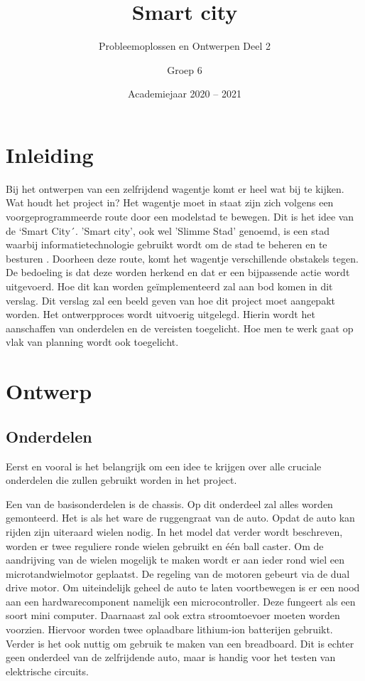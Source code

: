 \documentclass[a4paper,twoside,kulak]{kulakreport} %
\title{Smart city}
\subtitle{Probleemoplossen en Ontwerpen Deel 2}
\author{Groep 6}
\institute {Barbier Jolien, Bossuyt Mathis, De Meester Sarah,
\newline Demuynck Dieter en Jans Rani 
\newline 
o.l.v. Boussé Martijn, Maveau Benjamin en Truyaert Kevin}
\date{Academiejaar 2020 -- 2021}
\begin{document}

\titlepage 
\tableofcontents
\renewcommand\thesection{\arabic{section}}
\renewcommand\thesubsection{\thesection.\arabic{subsection}}
\newpage
\section*{Inleiding}

Bij het ontwerpen van een zelfrijdend wagentje komt er heel wat bij te kijken. Wat houdt het project in? Het wagentje moet in staat zijn zich volgens een voorgeprogrammeerde route door een modelstad te bewegen. Dit is het idee van de `Smart City´. 'Smart city', ook wel 'Slimme Stad' genoemd, is een stad waarbij informatietechnologie gebruikt wordt om de stad te beheren en te besturen \cite{SmartCity}. Doorheen deze route, komt het wagentje verschillende obstakels tegen. De bedoeling is dat deze worden herkend en dat er een bijpassende actie wordt uitgevoerd. Hoe dit kan worden geïmplementeerd zal aan bod komen in dit verslag.
Dit verslag zal een beeld geven van hoe dit project moet aangepakt worden. Het ontwerpproces wordt uitvoerig uitgelegd. Hierin wordt het aanschaffen van onderdelen en de vereisten toegelicht. Hoe men te werk gaat op vlak van planning wordt ook toegelicht.

\section{Ontwerp}

\subsection{Onderdelen}

Eerst en vooral is het belangrijk om een idee te krijgen over alle cruciale onderdelen die zullen gebruikt worden in het project. 

Een van de basisonderdelen is de chassis. Op dit onderdeel zal alles worden gemonteerd. Het is als het ware de ruggengraat van de auto.%
Opdat de auto kan rijden zijn uiteraard wielen nodig. In het model dat verder wordt beschreven, worden er twee reguliere ronde wielen gebruikt en één ball caster. Om de aandrijving van de wielen mogelijk te maken wordt er aan ieder rond wiel een microtandwielmotor geplaatst. De regeling van de motoren gebeurt via de dual drive motor. Om uiteindelijk geheel de auto te laten voortbewegen is er een nood aan een hardwarecomponent namelijk een microcontroller. Deze fungeert als een soort mini computer. Daarnaast zal ook extra stroomtoevoer moeten worden voorzien. Hiervoor worden twee oplaadbare lithium-ion batterijen gebruikt. Verder is het ook nuttig om gebruik te maken van een breadboard. Dit is echter geen onderdeel van de zelfrijdende auto, maar is handig voor het testen van elektrische circuits.
\end{document}
